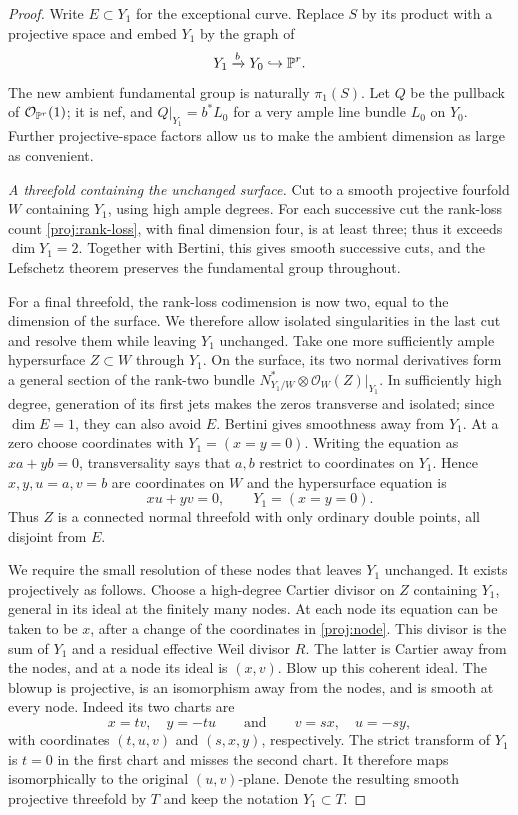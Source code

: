 \begin{proof}
Write $E\subset Y_1$ for the exceptional curve.  Replace $S$ by its
product with a projective space and embed $Y_1$ by the graph of
\[
 Y_1\xrightarrow{b}Y_0\hookrightarrow\mathbb P^r.
\]
The new ambient fundamental group is naturally $\pi_1(S)$.  Let $Q$
be the pullback of $\mathcal O_{\mathbb P^r}(1)$; it is nef, and
$Q|_{Y_1}=b^*L_0$ for a very ample line bundle $L_0$ on $Y_0$.
Further projective-space factors allow us to make the ambient dimension
as large as convenient.

\smallskip
\noindent\emph{A threefold containing the unchanged surface.}
Cut to a smooth projective fourfold $W$ containing $Y_1$, using high
ample degrees.  For each successive cut the rank-loss count
\eqref{proj:rank-loss}, with final dimension four, is at least three;
thus it exceeds $\dim Y_1=2$.  Together with Bertini, this gives smooth
successive cuts, and the Lefschetz theorem preserves the fundamental
group throughout.

For a final threefold, the rank-loss codimension is now two, equal to
the dimension of the surface.  We therefore allow isolated singularities
in the last cut and resolve them while leaving $Y_1$ unchanged.
Take one more sufficiently ample hypersurface $Z\subset W$ through
$Y_1$.  On the surface, its two normal derivatives form a general
section of the rank-two bundle
$N^*_{Y_1/W}\otimes\mathcal O_W(Z)|_{Y_1}$.  In sufficiently high
degree, generation of its first jets makes the zeros transverse and
isolated; since $\dim E=1$, they can also avoid $E$.  Bertini gives
smoothness away from $Y_1$.  At a zero choose coordinates with
$Y_1=(x=y=0)$.  Writing the equation as $xa+yb=0$, transversality says
that $a,b$ restrict to coordinates on $Y_1$.  Hence $x,y,u=a,v=b$ are
coordinates on $W$ and the hypersurface equation is
\begin{equation}\label{proj:node}
 xu+yv=0,\qquad Y_1=(x=y=0).
\end{equation}
Thus $Z$ is a connected normal threefold with only ordinary double
points, all disjoint from $E$.

We require the small resolution of these nodes that leaves $Y_1$
unchanged.  It exists projectively as follows.  Choose a high-degree
Cartier divisor on $Z$ containing $Y_1$, general in its ideal at the
finitely many nodes.  At each node its equation can be taken to be
$x$, after a change of the coordinates in \eqref{proj:node}.  This
divisor is the sum of $Y_1$ and a residual effective Weil divisor $R$.
The latter is Cartier away from the nodes, and at a node its ideal is
$(x,v)$.  Blow up this coherent ideal.  The blowup is projective, is an
isomorphism away from the nodes, and is smooth at every node.  Indeed
its two charts are
\[
 x=tv,\quad y=-tu
 \qquad\text{and}\qquad
 v=sx,\quad u=-sy,
\]
with coordinates $(t,u,v)$ and $(s,x,y)$, respectively.  The strict
transform of $Y_1$ is $t=0$ in the first chart and misses the second
chart.  It therefore maps isomorphically to the original $(u,v)$-plane.
Denote the resulting smooth projective threefold by $T$ and keep the
notation $Y_1\subset T$.


\end{proof}
